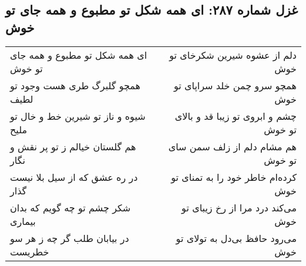 \begin{center}
\section*{غزل شماره ۲۸۷: ای همه شکل تو مطبوع و همه جای تو خوش}
\label{sec:sh287}
\begin{longtable}{l p{0.5cm} r}
ای همه شکل تو مطبوع و همه جای تو خوش
&&
دلم از عشوه شیرین شکرخای تو خوش
\\
همچو گلبرگ طری هست وجود تو لطیف
&&
همچو سرو چمن خلد سراپای تو خوش
\\
شیوه و ناز تو شیرین خط و خال تو ملیح
&&
چشم و ابروی تو زیبا قد و بالای تو خوش
\\
هم گلستان خیالم ز تو پر نقش و نگار
&&
هم مشام دلم از زلف سمن سای تو خوش
\\
در ره عشق که از سیل بلا نیست گذار
&&
کرده‌ام خاطر خود را به تمنای تو خوش
\\
شکر چشم تو چه گویم که بدان بیماری
&&
می‌کند درد مرا از رخ زیبای تو خوش
\\
در بیابان طلب گر چه ز هر سو خطریست
&&
می‌رود حافظ بی‌دل به تولای تو خوش
\\
\end{longtable}
\end{center}
